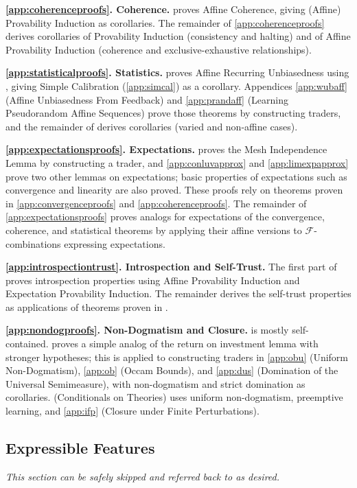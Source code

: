 \documentclass[authordate,onecolumn,noenvironments]{miri-tech-article}
\numberwithin{equation}{subsection}
\newcommand{\features}{\mathcal{F}} %
\begin{document}
\textbf{\ref{app:coherenceproofs}. Coherence.}  proves Affine Coherence, giving (Affine) Provability Induction as corollaries. The remainder of \ref{app:coherenceproofs} derives corollaries of Provability Induction (consistency and halting) and of Affine Provability Induction (coherence and exclusive-exhaustive relationships).

\textbf{\ref{app:statisticalproofs}. Statistics.}  proves Affine Recurring Unbiasedness using , giving Simple Calibration (\ref{app:simcal}) as a corollary. Appendices \ref{app:wubaff}  (Affine Unbiasedness From Feedback) and \ref{app:prandaff} (Learning Pseudorandom Affine Sequences) prove those theorems by constructing traders, and the remainder of  derives corollaries (varied and non-affine cases). 

\textbf{\ref{app:expectationsproofs}. Expectations.}  proves the Mesh Independence Lemma by constructing a trader, and \ref{app:conluvapprox} and \ref{app:limexpapprox} prove two other lemmas on expectations; basic properties  of expectations such as convergence and linearity are  also proved. These proofs rely on theorems proven in \ref{app:convergenceproofs} and \ref{app:coherenceproofs}. The remainder of \ref{app:expectationsproofs}  proves analogs for expectations of the convergence, coherence, and statistical theorems   by applying their affine versions to $\features$-combinations expressing expectations. 

\textbf{\ref{app:introspectiontrust}. Introspection and Self-Trust.} The first part of  proves introspection properties using Affine Provability Induction and Expectation Provability Induction. The remainder derives the self-trust properties as applications of theorems proven in .

\textbf{\ref{app:nondogproofs}. Non-Dogmatism and Closure.}  is mostly self-contained.  proves a simple analog of the return on investment lemma with stronger hypotheses; this is applied to constructing traders in \ref{app:obu} (Uniform Non-Dogmatism), \ref{app:ob} (Occam Bounds), and \ref{app:dus} (Domination of the Universal Semimeasure), with non-dogmatism and strict domination as corollaries.  (Conditionals on Theories) uses uniform non-dogmatism, preemptive learning, and  \ref{app:ifp} (Closure under Finite Perturbations).



\subsection{Expressible Features}\label{app:expressiblefeatures}
\emph{This section can be safely skipped and referred back to as desired.}
\end{document}
